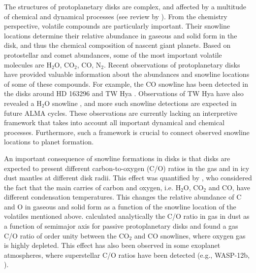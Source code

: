 \documentclass[apj]{emulateapj}
\newcommand{\emgr}[1]{\emph{ \color{gray} #1}}
\begin{document}
The structures of protoplanetary disks are complex, and affected by a multitude of chemical and dynamical processes (see review by \citealt{henning13}). From the chemistry perspective, volatile compounds are particularly important. Their snowline locations determine their relative abundance in gaseous and solid form in the disk, and thus the chemical composition of nascent giant planets. Based on protostellar and comet abundances, some of the most important volatile molecules are H$_2$O, CO$_2$, CO, N$_2$. Recent observations of protoplanetary disks have provided valuable information about the abundances and snowline locations of some of these compounds. For example, the CO snowline has been detected in the disks around HD 163296 \citep{qi11} and TW Hya \citep{qi13}. Observations of TW Hya have also revealed a H$_2$O snowline \citep{zhang13}, and more such snowline detections are expected in future ALMA cycles. These observations are currently lacking an interpretive framework that takes into account all important dynamical and chemical processes. Furthermore, such a framework is crucial to connect observed snowline locations to planet formation.





An important consequence of snowline formations in disks is that disks are expected to present different carbon-to-oxygen (C/O) ratios in the gas and in icy dust mantles at different disk radii. This effect was quantified by  \citet{oberg11}, who considered the fact that the main carries of carbon and oxygen, i.e. H$_2$O, CO$_2$ and CO, have different condensation temperatures. This changes the relative abundance of C and O in gaseous and solid form as a function of the snowline location of the volatiles mentioned above. \citet{oberg11} calculated analytically the C/O ratio in gas in dust as a function of semimajor axis for passive protoplanetary disks and found a gas C/O ratio of order unity between the CO$_2$ and CO snowlines, where oxygen gas is highly depleted. This effect has also been observed in some exoplanet atmospheres, where superstellar C/O ratios have been detected (e.g., WASP-12b, \citealt{madhu11}).
\end{document}
